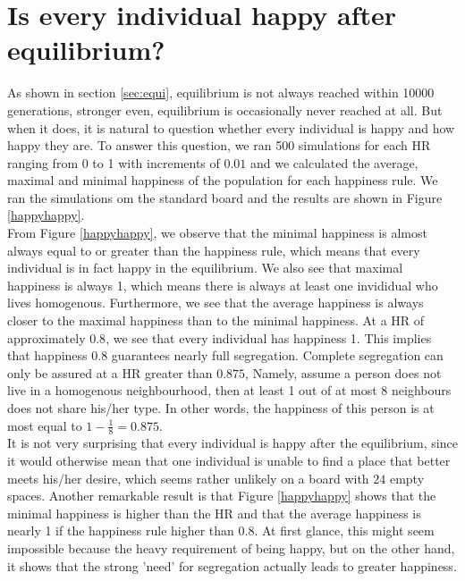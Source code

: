 
\section{Is every individual happy after equilibrium?} 
\label{sec:meanhappy}
As shown in section \ref{sec:equi}, equilibrium is not always reached within 10000 generations, stronger even, equilibrium is occasionally never reached at all.
But when it does, it is natural to question whether every individual is happy and how happy they are. 
To answer this question, we ran 500 simulations for each HR ranging from 0 to 1 with increments of $0.01$ and we calculated the average, maximal and minimal happiness of the population for each happiness rule. 
We ran the simulations om the standard board and the results are shown in Figure \ref{happyhappy}.\\

From Figure \ref{happyhappy}, we observe that the minimal happiness is almost always equal to or greater than the happiness rule, which means that every individual is in fact happy  in the equilibrium. 
We also see that maximal happiness is always 1, which means there is always at least one invididual who lives homogenous. 
Furthermore, we see that the average happiness is always closer to the maximal happiness than to the minimal happiness. At a HR of approximately $0.8$, we see that every individual has happiness 1. 
This implies that happiness $0.8$ guarantees nearly full segregation. Complete segregation can only be assured at a HR greater than $0.875$, Namely, assume a person does not live in a homogenous neighbourhood, then at least 1 out of at most 8 neighbours does not share his/her type. In other words, the happiness of this person is at most equal to \(1-\frac{1}{8}=0.875\).\\

It is not very surprising that every individual is happy after the equilibrium, since it would otherwise mean that one individual is unable to find a place that better meets his/her desire, which seems rather unlikely on a board with $24$ empty spaces. 
Another remarkable result is that Figure \ref{happyhappy} shows that the minimal happiness is higher than the HR and that the average happiness is nearly 1 if the happiness rule higher than $0.8$. 
At first glance, this might seem impossible because the heavy requirement of being happy, but on the other hand, it shows that the strong 'need' for segregation actually leads to greater happiness.

